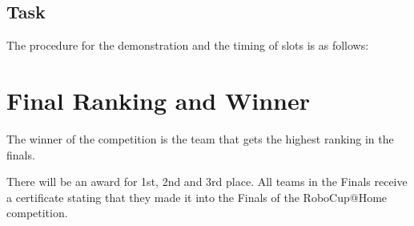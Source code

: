 \subsection{Task}
The procedure for the demonstration and the timing of slots is as follows:

\OpenDemonstrationChanges

\section{Final Ranking and Winner}

The winner of the competition is the team that gets the highest
ranking in the finals.

There will be an award for 1st, 2nd and 3rd place. All teams in the
Finals receive a certificate stating that they made it into the Finals
of the RoboCup@Home competition.


